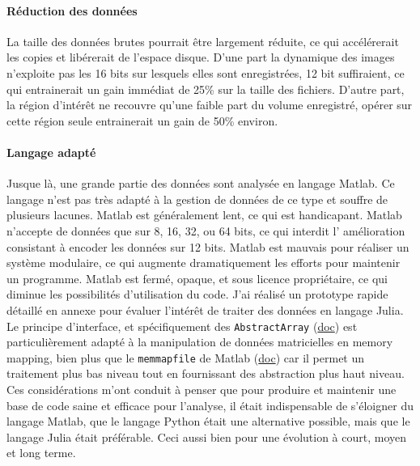 
\paragraph{Réduction des données}
La taille des données brutes pourrait être largement réduite, ce qui accélérerait les copies et libérerait de l'espace disque. D'une part la dynamique des images n'exploite pas les 16 bits sur lesquels elles sont enregistrées, 12 bit suffiraient, ce qui entrainerait un gain immédiat de 25\% sur la taille des fichiers. D'autre part, la région d'intérêt ne recouvre qu'une faible part du volume enregistré, opérer sur cette région seule entrainerait un gain de 50\% environ.


\paragraph{Langage adapté} %
Jusque là, une grande partie des données sont analysée en langage Matlab. Ce langage n'est pas très adapté à la gestion de données de ce type et souffre de plusieurs lacunes. Matlab est généralement lent, ce qui est handicapant. Matlab n'accepte de données que sur 8, 16, 32, ou 64 bits, ce qui interdit l' amélioration consistant à encoder les données sur 12 bits. Matlab est mauvais pour réaliser un système modulaire, ce qui augmente dramatiquement les efforts pour maintenir un programme. Matlab est fermé, opaque, et sous licence propriétaire, ce qui diminue les possibilités d'utilisation du code.
J'ai réalisé un prototype rapide détaillé en annexe pour évaluer l'intérêt de traiter des données en langage Julia. Le principe d'interface, et spécifiquement des \verb|AbstractArray| (\href{https://docs.julialang.org/en/v1/manual/interfaces/#man-interface-array-1}{doc}) est particulièrement adapté à la manipulation de données matricielles en memory mapping, bien plus que le \verb|memmapfile| de Matlab (\href{https://fr.mathworks.com/help/matlab/ref/memmapfile.html}{doc}) car il permet un traitement plus bas niveau tout en fournissant des abstraction plus haut niveau. Ces considérations m'ont conduit à penser que pour produire et maintenir une base de code saine et efficace pour l'analyse, il était indispensable de s'éloigner du langage Matlab, que le langage Python était une alternative possible, mais que le langage Julia était préférable. Ceci aussi bien pour une évolution à court, moyen et long terme.

